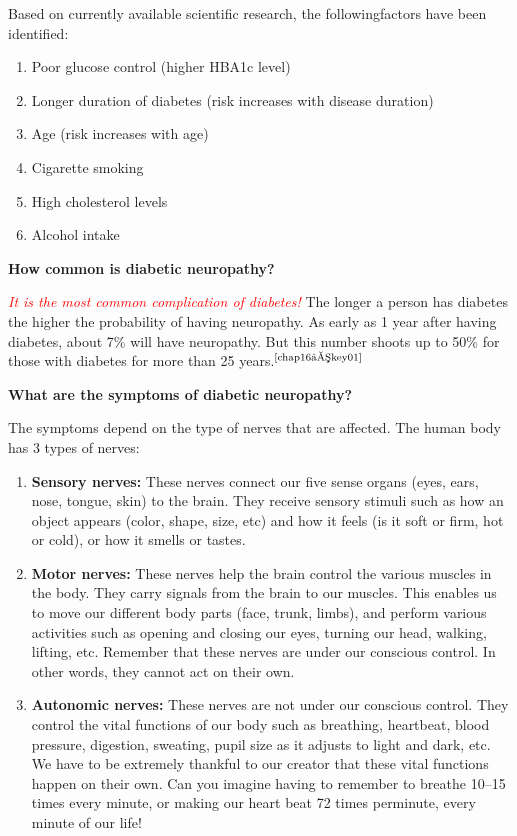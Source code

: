 Based on currently available scientific research, the following\break factors have been identified:

\begin{enumerate}[•]
\itemsep=0pt
\item Poor glucose control (higher HBA1c level)
\item Longer duration of diabetes (risk increases with disease duration)
\item Age (risk increases with age)
\item Cigarette smoking
\item High cholesterol levels
\item Alcohol intake
\end{enumerate}

\noindent\textbf{How common is diabetic neuropathy?}

\textcolor{red}{\textit{It is the most common complication of diabetes!}} The longer a person has diabetes the higher the probability of having neuropathy. As early as 1 year after having diabetes, about 7\% will have neuropathy. But this number shoots up to 50\% for those with diabetes for more than 25 years.$^{\text{\cite{chap16–key01}}}$

\noindent\textbf{What are the symptoms of diabetic neuropathy?}

The symptoms depend on the type of nerves that are affected. The human body has 3 types of nerves:

\begin{enumerate}
\itemsep=0pt
\item \textbf{Sensory nerves:} These nerves connect our five sense organs (eyes, ears, nose, tongue, skin) to the brain. They receive sensory stimuli such as how an object appears (color, shape, size, etc) and how it feels (is it soft or firm, hot or cold), or how it smells or tastes.
\item \textbf{Motor nerves:} These nerves help the brain control the various muscles in the body. They carry signals from the brain to our muscles. This enables us to move our different body parts (face, trunk, limbs), and perform various activities such as opening and closing our eyes, turning our head, walking, lifting, etc. Reme\-mber that these nerves are under our conscious control. In other words, they cannot act on their own.
\item \textbf{Autonomic nerves:} These nerves are not under our conscious control. They control the vital functions of our body such as breathing, heartbeat, blood pressure, digestion, sweating, pupil size as it adjusts to light and dark, etc. We have to be extremely thankful to our creator that these vital functions happen on their own. Can you imagine having to remember to breathe 10–15 times every minute, or making our heart beat 72 times per\break minute, every minute of our life!
\end{enumerate}

